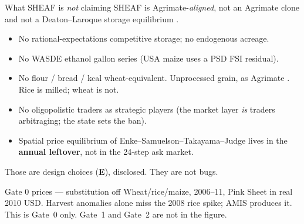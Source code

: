 \begin{frame}{What SHEAF is \emph{not} claiming}
SHEAF is Agrimate-\emph{aligned}, not an Agrimate clone and not a
Deaton--Laroque storage equilibrium \citep{deaton1992,wright1982,williams1991}.

\begin{itemize}
\item No rational-expectations competitive storage; no endogenous acreage.
\item No WASDE ethanol gallon series (USA maize uses a PSD FSI residual).
\item No flour / bread / kcal wheat-equivalent. Unprocessed grain, as
      Agrimate \citep{kuhla2025}. Rice is milled; wheat is not.
\item No oligopolistic traders as strategic players (the market layer
      \emph{is} traders arbitraging; the state sets the ban).
\item Spatial price equilibrium of Enke--Samuelson--Takayama--Judge
      \citep{enke1951,samuelson1952,takayama1971} lives in the
      \textbf{annual leftover}, not in the 24-step ask market.
\end{itemize}

Those are design choices (\textbf{E}), disclosed. They are not bugs.
\end{frame}

\begin{frame}{Gate 0 prices --- substitution off}
{\scriptsize Wheat/rice/maize, 2006--11, Pink Sheet in real 2010 USD.
Harvest anomalies alone miss the 2008 rice spike; AMIS produces it.
This is Gate~0 only. Gate~1 and Gate~2 are not in the figure.}
\end{frame}

